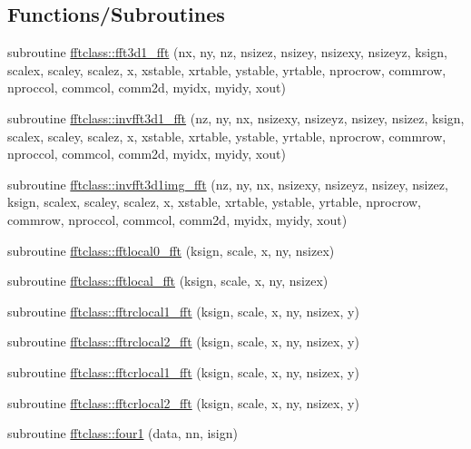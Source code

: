 \subsection*{Functions/\+Subroutines}
\begin{DoxyCompactItemize}
\item 
subroutine \mbox{\hyperlink{namespacefftclass_acef38aed3ece8d2c1120ce0004e6297e}{fftclass\+::fft3d1\+\_\+fft}} (nx, ny, nz, nsizez, nsizey, nsizexy, nsizeyz, ksign, scalex, scaley, scalez, x, xstable, xrtable, ystable, yrtable, nprocrow, commrow, nproccol, commcol, comm2d, myidx, myidy, xout)
\item 
subroutine \mbox{\hyperlink{namespacefftclass_a21e8a7bd2877ec439bc4f0e0bc0e4681}{fftclass\+::invfft3d1\+\_\+fft}} (nz, ny, nx, nsizexy, nsizeyz, nsizey, nsizez, ksign, scalex, scaley, scalez, x, xstable, xrtable, ystable, yrtable, nprocrow, commrow, nproccol, commcol, comm2d, myidx, myidy, xout)
\item 
subroutine \mbox{\hyperlink{namespacefftclass_a374c599138aeca237d4c303a07a470ee}{fftclass\+::invfft3d1img\+\_\+fft}} (nz, ny, nx, nsizexy, nsizeyz, nsizey, nsizez, ksign, scalex, scaley, scalez, x, xstable, xrtable, ystable, yrtable, nprocrow, commrow, nproccol, commcol, comm2d, myidx, myidy, xout)
\item 
subroutine \mbox{\hyperlink{namespacefftclass_a501325267c1425bfece04a18e20efe31}{fftclass\+::fftlocal0\+\_\+fft}} (ksign, scale, x, ny, nsizex)
\item 
subroutine \mbox{\hyperlink{namespacefftclass_aa64d94b8c8578b384955207a409a2445}{fftclass\+::fftlocal\+\_\+fft}} (ksign, scale, x, ny, nsizex)
\item 
subroutine \mbox{\hyperlink{namespacefftclass_af33a24fc1bf4d5763c335c0cef247e3c}{fftclass\+::fftrclocal1\+\_\+fft}} (ksign, scale, x, ny, nsizex, y)
\item 
subroutine \mbox{\hyperlink{namespacefftclass_a83a1c8ccf853ae07fdfc5a80e1e244d1}{fftclass\+::fftrclocal2\+\_\+fft}} (ksign, scale, x, ny, nsizex, y)
\item 
subroutine \mbox{\hyperlink{namespacefftclass_a25ecfa928dd28501b9c251c1e887996b}{fftclass\+::fftcrlocal1\+\_\+fft}} (ksign, scale, x, ny, nsizex, y)
\item 
subroutine \mbox{\hyperlink{namespacefftclass_a62d05d7b0980c823708d03f4a1520c1e}{fftclass\+::fftcrlocal2\+\_\+fft}} (ksign, scale, x, ny, nsizex, y)
\item 
subroutine \mbox{\hyperlink{namespacefftclass_a4597d420a1363f9fd0b652472d7caf52}{fftclass\+::four1}} (data, nn, isign)

\end{DoxyCompactItemize}
